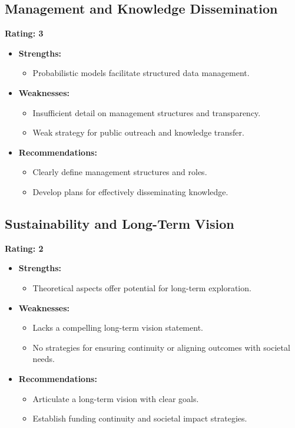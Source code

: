 \documentclass{article}
\begin{document}
\subsection{Management and Knowledge Dissemination}
\textbf{Rating: 3}

\begin{itemize}
    \item \textbf{Strengths:} 
    \begin{itemize}
        \item Probabilistic models facilitate structured data management.
    \end{itemize}
    \item \textbf{Weaknesses:} 
    \begin{itemize}
        \item Insufficient detail on management structures and transparency.
        \item Weak strategy for public outreach and knowledge transfer.
    \end{itemize}
    \item \textbf{Recommendations:}
    \begin{itemize}
        \item Clearly define management structures and roles.
        \item Develop plans for effectively disseminating knowledge.
    \end{itemize}
\end{itemize}

\subsection{Sustainability and Long-Term Vision}
\textbf{Rating: 2}

\begin{itemize}
    \item \textbf{Strengths:} 
    \begin{itemize}
        \item Theoretical aspects offer potential for long-term exploration.
    \end{itemize}
    \item \textbf{Weaknesses:} 
    \begin{itemize}
        \item Lacks a compelling long-term vision statement.
        \item No strategies for ensuring continuity or aligning outcomes with societal needs.
    \end{itemize}
    \item \textbf{Recommendations:}
    \begin{itemize}
        \item Articulate a long-term vision with clear goals.
        \item Establish funding continuity and societal impact strategies.
    \end{itemize}
\end{itemize}
\end{document}
